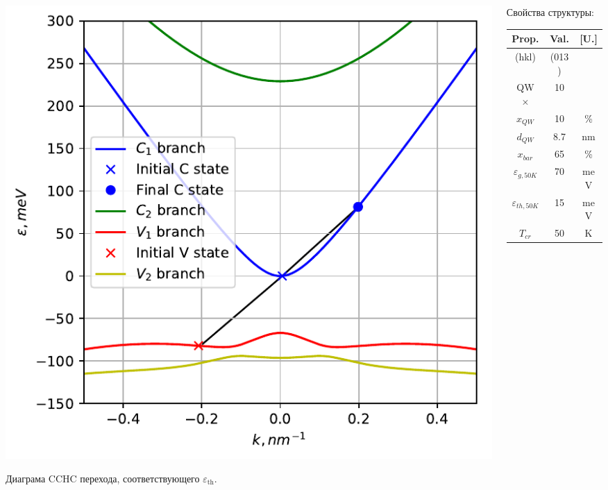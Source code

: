\documentclass[9pt,pdf]{beamer}
\begin{document}
\begin{frame}
\begin{columns}
\begin{column}{0.7\textwidth}
\begin{overprint}
                    \begin{center}
                        \includegraphics[width=1\textwidth]{images/18um_impure_40K.pdf}
                    \end{center}
                    Диаграма CCHC перехода, соответствующего $\varepsilon_\text{th}$.
                \end{overprint}
            \end{column}
            \hfill
            \begin{column}{0.3\textwidth}
                Свойства структуры:
                \begin{center}
                    \begin{tabular}{c | c c}
                        Prop.   & Val.  & [U.]\\
                        \hline
                        (hkl)       &  (013)    &\\
                        QW $\times$ &   10      &\\
                        $x_{QW}$    & 10   & \%\\
                        $d_{QW}$    & 8.7  & nm\\
                        $x_{bar}$  & 65   & \%\\
                        $\varepsilon_{g, 50K}$ & 70 & meV\\
                        $\varepsilon_{th, 50K}$  & 15 & meV\\
                        $T_{cr}$       & 50 & K
                    \end{tabular}
                \end{center}
            \end{column}
        \end{columns}
    \end{frame}
\end{document}
